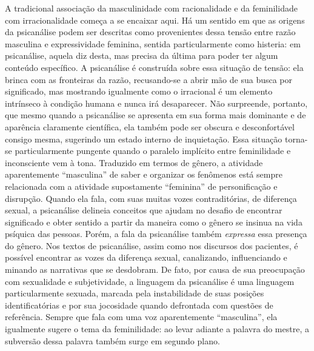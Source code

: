 A tradicional associação da masculinidade com racionalidade e da
feminilidade com irracionalidade começa a se encaixar aqui. Há um
sentido em que as origens da psicanálise podem ser descritas como
provenientes dessa tensão entre razão masculina e expressividade
feminina, sentida particularmente como histeria: em psicanálise, aquela
diz desta, mas precisa da última para poder ter algum conteúdo
específico. A psicanálise é construída sobre essa situação de tensão:
ela brinca com as fronteiras da razão, recusando-se a abrir mão de sua
busca por significado, mas mostrando igualmente como o irracional é um
elemento intrínseco à condição humana e nunca irá desaparecer. Não
surpreende, portanto, que mesmo quando a psicanálise se apresenta em sua
forma mais dominante e de aparência claramente científica, ela também
pode ser obscura e desconfortável consigo mesma, sugerindo um estado
interno de inquietação. Essa situação torna-se particularmente pungente
quando o paralelo implícito entre feminilidade e inconsciente vem à
tona. Traduzido em termos de gênero, a atividade aparentemente
``masculina'' de saber e organizar os fenômenos está sempre relacionada
com a atividade supostamente ``feminina'' de personificação e disrupção.
Quando ela fala, com suas muitas vozes contraditórias, de diferença
sexual, a psicanálise delineia conceitos que ajudam no desafio de
encontrar significado e obter sentido a partir da maneira como o gênero
se insinua na vida psíquica das pessoas. Porém, a fala da psicanálise
também \emph{expressa} essa presença do gênero. Nos textos de
psicanálise, assim como nos discursos dos pacientes, é possível
encontrar as vozes da diferença sexual, canalizando, influenciando e
minando as narrativas que se desdobram. De fato, por causa de sua
preocupação com sexualidade e subjetividade, a linguagem da psicanálise
é uma linguagem particularmente sexuada, marcada pela instabilidade de
suas posições identificatórias e por sua jocosidade quando defrontada
com questões de referência. Sempre que fala com uma voz aparentemente
``masculina'', ela igualmente sugere o tema da feminilidade: ao levar
adiante a palavra do mestre, a subversão dessa palavra também surge em
segundo plano.

